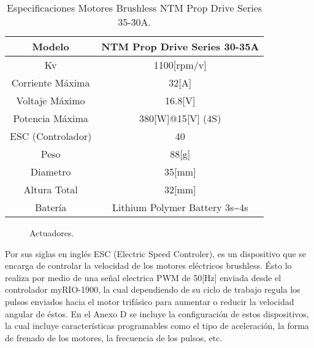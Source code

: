 \documentclass[\main/main.tex]{subfiles}
\begin{document}
\begin{table}[H]
\noindent \begin{centering}
\begin{tabular}{|c|c|}
\hline 
\multicolumn{1}{|c}{Modelo } & NTM Prop Drive Series 30-35A\tabularnewline
\hline 
\hline 
Kv & 1100{[}rpm/v{]}\tabularnewline
\hline 
Corriente Máxima & 32{[}A{]}\tabularnewline
\hline 
Voltaje Máximo & 16.8{[}V{]}\tabularnewline
\hline 
Potencia Máxima & 380{[}W{]}@15{[}V{]} (4S)\tabularnewline
\hline 
ESC (Controlador) & 40\tabularnewline
\hline 
Peso & 88{[}g{]}\tabularnewline
\hline 
Diametro & 35{[}mm{]}\tabularnewline
\hline 
Altura Total & 32{[}mm{]}\tabularnewline
\hline 
Batería & Lithium Polymer Battery 3s\textasciitilde{}4s\tabularnewline
\hline 
\end{tabular}
\par\end{centering}
\caption{Especificaciones Motores Brushless NTM Prop Drive Series 35-30A.}
\end{table}

\begin{figure}[H]
\noindent \begin{centering}
\par\end{centering}
\caption{Actuadores.}
\end{figure}


Por sus siglas en inglés ESC (Electric Speed Controler), es un dispositivo
que se encarga de controlar la velocidad de los motores eléctricos brushless. Ésto lo realiza por medio de una señal electrica PWM de
50{[}Hz{]} enviada desde el controlador myRIO-1900, la cual dependiendo
de su ciclo de trabajo regula los pulsos enviados hacia el motor trifásico
para aumentar o reducir la velocidad angular de éstos. En el Anexo D
se incluye la configuración de estos dispositivos, la cual incluye
características programables como el tipo de aceleración, la forma
de frenado de los motores, la frecuencia de los pulsos, etc.
\end{document}
